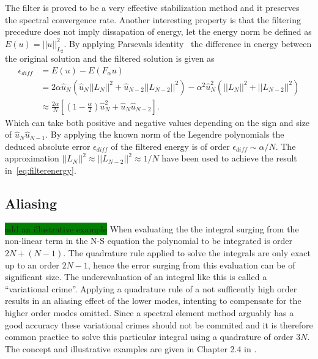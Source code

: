 The filter is proved to be a very effective stabilization method and it preserves the 
spectral convergence rate. Another interesting property is that the filtering precedure 
does not imply dissapation of energy, let the energy norm be defined as $E(u) = ||u||_{L_2}^2$.  
By applying Parsevals identity~\cite{Young} the difference in energy between the original solution
and the filtered solution is given as 
\begin{align}
   \epsilon_{diff}&=E(u) - E(F_{\alpha}u) \\
                &= 2\alpha\hat{u}_N(\hat{u}_N||L_N||^2+\hat{u}_{N-2}||L_{N-2}||^2)
    - \alpha^2\hat{u}^2_N(||L_N||^2+||L_{N-2}||^2)\\
    &\approx \frac{2\alpha}{N}\left[  (1-\frac{\alpha}{2})\hat{u}_N^2 + 
    \hat{u}_N\hat{u}_{N-2}\right].
    \label{eq:filterenergy}
\end{align}
Which can take both positive and negative values depending on the sign and size of
$\hat{u}_N\hat{u}_{N-1}$. By applying the known norm of the Legendre polynomials 
the deduced absolute error $\epsilon_{diff}$ of the filtered energy is of order 
$\epsilon_{diff}\sim \alpha/N$. The approximation $||L_N||^2\approx||L_{N-2}||^2\approx 1/N$
have been used to achieve the result in~\ref{eq:filterenergy}.
\subsection{Aliasing}
\colorbox{green}{add an illustrative example}
When evaluating the the integral surging from the non-linear term in the N-S equation 
the polynomial to be integrated is order $2N+(N-1)$. The quadrature rule applied to solve the 
integrals are only exact up to an order $2N-1$, hence the error surging from this evaluation 
can be of significant size. The underevaluation of an integral like this is called a ``variational
crime''. Applying a quadrature rule of a not sufficently high order results in an 
aliasing effect of the lower modes, intenting to compensate for the higher order modes omitted. 
Since a spectral element method arguably has a good accuracy these variational crimes should 
not be commited and it is therefore common practice to solve this particular integral using a
quadrature of order $3N$. The concept and illustrative examples are given in Chapter 2.4 in 
\cite{Karniadakis}.


